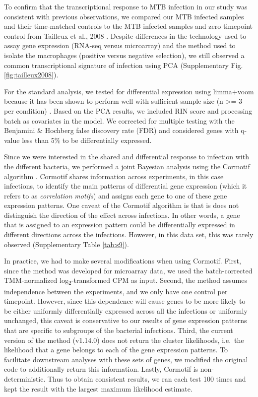 To confirm that the transcriptional response to MTB infection in our
study was consistent with previous observations, we compared our MTB
infected samples and their time-matched controls to the MTB infected
samples and zero timepoint control from Tailleux et al., 2008
\citep{Tailleux2008}. Despite differences in the technology used to assay
gene expression (RNA-seq versus microarray) and the method used to
isolate the macrophages (positive versus negative selection), we still
observed a common transcriptional signature of infection using PCA
(Supplementary Fig. \ref{fig:tailleux2008}).

For the standard analysis, we tested for differential expression using
limma+voom \citep{Smyth2004, Smyth2005, Law2014} because it has been
shown to perform well with sufficient sample size (n \textgreater{}= 3
per condition) \citep{Rapaport2013, Soneson2013}. Based on the PCA
results, we included RIN score and processing batch as covariates in the
model. We corrected for multiple testing with the Benjamini \& Hochberg
false discovery rate (FDR) \citep{Benjamini1995} and considered genes
with q-value less than 5\% to be differentially expressed.

Since we were interested in the shared and differential response to
infection with the different bacteria, we performed a joint Bayesian
analysis using the Cormotif algorithm \citep{Wei2015}. Cormotif shares
information across experiments, in this case infections, to identify the
main patterns of differential gene expression (which it refers to as
\emph{correlation motifs}) and assigns each gene to one of these gene
expression patterns. One caveat of the Cormotif algorithm is that is
does not distinguish the direction of the effect across infections. In
other words, a gene that is assigned to an expression pattern could be
differentially expressed in different directions across the infections.
However, in this data set, this was rarely observed (Supplementary Table
\ref{tab:s9}).

In practice, we had to make several modifications when using Cormotif.
First, since the method was developed for microarray data, we used the
batch-corrected TMM-normalized log\textsubscript{2}-transformed CPM as
input. Second, the method assumes independence between the experiments,
and we only have one control per timepoint. However, since this
dependence will cause genes to be more likely to be either uniformly
differentially expressed across all the infections or uniformly
unchanged, this caveat is conservative to our results of gene expression
patterns that are specific to subgroups of the bacterial infections.
Third, the current version of the method (v1.14.0) does not return the
cluster likelihoods, i.e.~the likelihood that a gene belongs to each of
the gene expression patterns. To facilitate downstream analyses with
these sets of genes, we modified the original code to additionally
return this information. Lastly, Cormotif is non-deterministic. Thus to
obtain consistent results, we ran each test 100 times and kept the
result with the largest maximum likelihood estimate.

